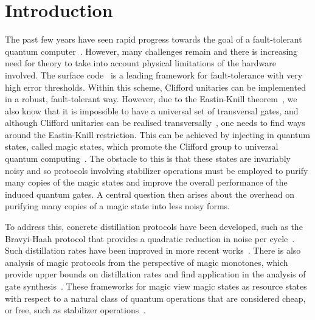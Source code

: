 \documentclass[pra,
aps,
twocolumn,
superscriptaddress,
groupedaddress,
nofootinbib,
reprint
]{revtex4-1}
\begin{document}

\section{Introduction}
\label{sec:intro}

The past few years have seen rapid progress towards the goal of a fault-tolerant quantum computer~\cite{Fowler_2012, Herrera_2010, Nickerson_2014, Nikahd_2017, chao_2018, lin_pieceable_2020, Lin_2020, Bourassa_2021}. However, many challenges remain and there is increasing need for theory to take into account physical limitations of the hardware involved. The surface code~\cite{Bravyi_1998, Freedman_2001, Dennis_2002, Raussendorf_2007} is a leading framework for fault-tolerance with very high error thresholds. Within this scheme, Clifford unitaries can be implemented in a robust, fault-tolerant way. However, due to the Eastin-Knill theorem~\cite{Eastin_2009}, we also know that it is impossible to have a universal set of transversal gates, and although Clifford unitaries can be realised transversally~\cite{Calderbank_1996, Steane_1996}, one needs to find ways around the Eastin-Knill restriction. This can be achieved by injecting in quantum states, called magic states, which promote the Clifford group to universal quantum computing~\cite{cit:bravyi}. The obstacle to this is that these states are invariably noisy and so protocols involving stabilizer operations must be employed to purify many copies of the magic states and improve the overall performance of the induced quantum gates. A central question then arises about the overhead on purifying many copies of a magic state into less noisy forms. 

To address this, concrete distillation protocols have been developed, such as the Bravyi-Haah protocol that provides a quadratic reduction in noise per cycle~\cite{Bravyi2012}. Such distillation rates have been improved in more recent works~\cite{Hastings2018, Litinski_2019, Krishna2019, cit:prakash}. There is also analysis of magic protocols from the perspective of magic monotones, which provide upper bounds on distillation rates and find application in the analysis of gate synthesis~\cite{Campbell_2017, Howard_2017, Prakash_2018}. These frameworks for magic view magic states as resource states with respect to a natural class of quantum operations that are considered cheap, or free, such as stabilizer operations~\cite{Gour_2019, cit:ahmadi, cit:seddon, Wang_2019}.
  
\end{document}
